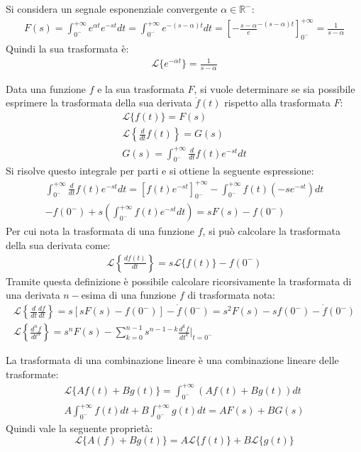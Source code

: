 \documentclass{article}
\numberwithin{equation}{subsection}
\begin{document}
Si considera un segnale esponenziale convergente $\alpha\in\mathbb{R}^-$:
\begin{gather*}
    F(s)=\displaystyle\int_{0^-}^{+\infty}e^{\alpha t}e^{-st}dt=\int_{0^-}^{+\infty}e^{-(s-\alpha)t}dt=\left[-\frac{s-\alpha}e^{-(s-\alpha)t}\right]^{+\infty}_{0^-}=\frac{1}{s-\alpha}
\end{gather*}
Quindi la sua trasformata è:
\begin{gather}
    \mathcal{L}\{e^{-\alpha t}\}=\displaystyle\frac{1}{s-\alpha}
\end{gather}


Data una funzione $f$ e la sua trasformata $F$, si vuole determinare se sia possibile esprimere la trasformata della sua derivata $\dot f(t)$ rispetto alla trasformata $F$:
\begin{gather*}
    \mathcal{L}\{f(t)\}=F(s)\\
    \mathcal{L}\left\{\displaystyle\frac{d}{dt}f(t)\right\}=G(s)\\
    G(s)=\displaystyle\int_{0^-}^{+\infty}\frac{d}{dt}f(t)e^{-st}dt
\end{gather*}
Si risolve questo integrale per parti e si ottiene la seguente espressione:
\begin{gather*}
    \displaystyle\int_{0^-}^{+\infty}\frac{d}{dt}f(t)e^{-st}dt=\left[f(t)e^{-st}\right]^{+\infty}_{0^-}-\int_{0^-}^{+\infty}f(t)(-se^{-st})dt\\
    \displaystyle-f(0^-)+s\left(\int_{0^-}^{+\infty}f(t)e^{-st}dt\right)=sF(s)-f(0^-) 
\end{gather*}
Per cui nota la trasformata di una funzione $f$, si può calcolare la trasformata della sua derivata come:
\begin{gather}
    \mathcal{L}\left\{\displaystyle\frac{df(t)}{dt}\right\}=s\mathcal{L}\{f(t)\}-f(0^-)
\end{gather}
Tramite questa definizione è possibile calcolare ricorsivamente la trasformata di una derivata $n-$esima di una funzione $f$ di trasformata nota:
\begin{gather*}
    \mathcal{L}\left\{\displaystyle\frac{d}{dt}\frac{df}{dt}\right\}=s\left[sF(s)-f(0^-)\right]-\dot f(0^-)=s^2F(s)-sf(0^-)-\dot f(0^-)\\
    \mathcal{L}\left\{\displaystyle\frac{d^nf}{dt^n}\right\}=s^nF(s)-\sum_{k=0}^{n-1}s^{n-1-k}\frac{d^kf}{dt^k}\Bigg|_{t=0^-}
\end{gather*}

La trasformata di una combinazione lineare è una combinazione lineare delle trasformate:
\begin{gather*}
    \mathcal{L}\{Af(t)+Bg(t)\}=\displaystyle\int_{0^-}^{+\infty}\left(Af(t)+Bg(t)\right)dt\\
    A\int_{0^-}^{+\infty}f(t)dt+B\int_{0^-}^{+\infty}g(t)dt=AF(s)+BG(s)
\end{gather*}
Quindi vale la seguente proprietà:
\begin{equation}
    \mathcal{L}\{A(f)+Bg(t)\}=A\mathcal{L}\{f(t)\}+B\mathcal{L}\{g(t)\}
\end{equation}
\end{document}
